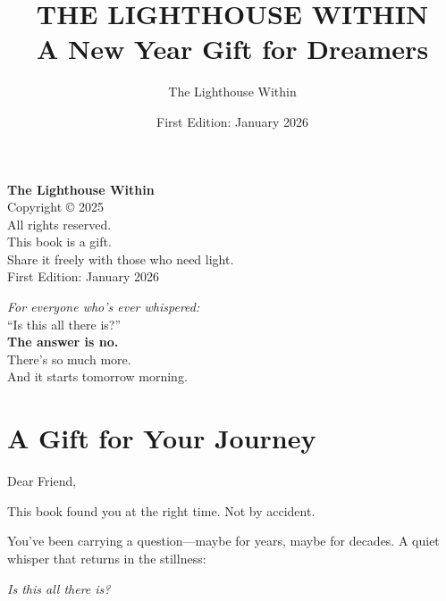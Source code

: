 \documentclass[11pt, a5paper, openright]{book}
\title{\textbf{THE LIGHTHOUSE WITHIN} \\ \vspace{0.5em} \large A New Year Gift for Dreamers}
\author{The Lighthouse Within}
\date{First Edition: January 2026}
\begin{document}
\frontmatter

\maketitle

\clearpage
\thispagestyle{empty}
\vspace*{\fill}
\begin{center}
\textbf{The Lighthouse Within}\\
Copyright © 2025\\
\vspace{1cm}
All rights reserved.\\
This book is a gift.\\
Share it freely with those who need light.\\
\vspace{1cm}
First Edition: January 2026
\end{center}
\vspace*{\fill}

\clearpage
\thispagestyle{empty}
\vspace*{\fill}
\begin{center}
\textit{For everyone who's ever whispered:}\\
\vspace{0.5em}
``Is this all there is?''\\
\vspace{1em}
\textbf{The answer is no.}\\
There's so much more.\\
And it starts tomorrow morning.
\end{center}
\vspace*{\fill}

\tableofcontents

\chapter*{A Gift for Your Journey}

Dear Friend,

This book found you at the right time. Not by accident.

You've been carrying a question—maybe for years, maybe for decades. A quiet whisper that returns in the stillness:

\begin{center}
\textit{Is this all there is?}
\end{center}
\end{document}
